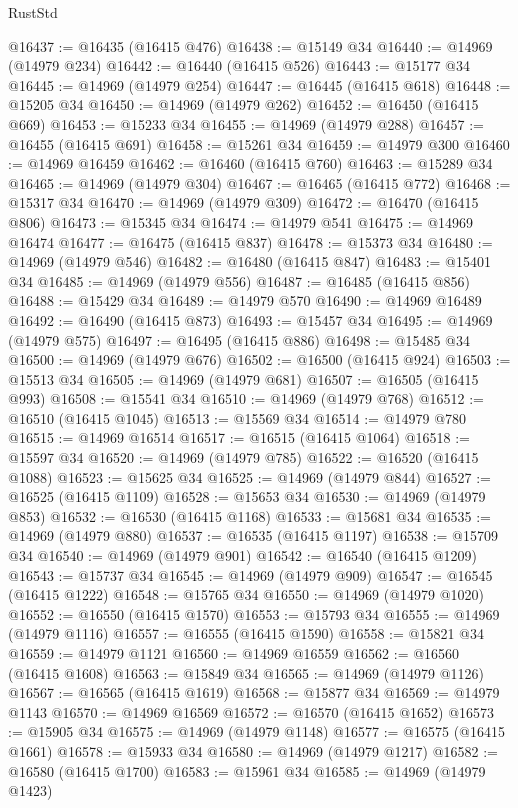 \begin{lexlean}{RustStd}
\begin{coremodule}
@16437 := @16435 (@16415 @476)
@16438 := @15149 @34
@16440 := @14969 (@14979 @234)
@16442 := @16440 (@16415 @526)
@16443 := @15177 @34
@16445 := @14969 (@14979 @254)
@16447 := @16445 (@16415 @618)
@16448 := @15205 @34
@16450 := @14969 (@14979 @262)
@16452 := @16450 (@16415 @669)
@16453 := @15233 @34
@16455 := @14969 (@14979 @288)
@16457 := @16455 (@16415 @691)
@16458 := @15261 @34
@16459 := @14979 @300
@16460 := @14969 @16459
@16462 := @16460 (@16415 @760)
@16463 := @15289 @34
@16465 := @14969 (@14979 @304)
@16467 := @16465 (@16415 @772)
@16468 := @15317 @34
@16470 := @14969 (@14979 @309)
@16472 := @16470 (@16415 @806)
@16473 := @15345 @34
@16474 := @14979 @541
@16475 := @14969 @16474
@16477 := @16475 (@16415 @837)
@16478 := @15373 @34
@16480 := @14969 (@14979 @546)
@16482 := @16480 (@16415 @847)
@16483 := @15401 @34
@16485 := @14969 (@14979 @556)
@16487 := @16485 (@16415 @856)
@16488 := @15429 @34
@16489 := @14979 @570
@16490 := @14969 @16489
@16492 := @16490 (@16415 @873)
@16493 := @15457 @34
@16495 := @14969 (@14979 @575)
@16497 := @16495 (@16415 @886)
@16498 := @15485 @34
@16500 := @14969 (@14979 @676)
@16502 := @16500 (@16415 @924)
@16503 := @15513 @34
@16505 := @14969 (@14979 @681)
@16507 := @16505 (@16415 @993)
@16508 := @15541 @34
@16510 := @14969 (@14979 @768)
@16512 := @16510 (@16415 @1045)
@16513 := @15569 @34
@16514 := @14979 @780
@16515 := @14969 @16514
@16517 := @16515 (@16415 @1064)
@16518 := @15597 @34
@16520 := @14969 (@14979 @785)
@16522 := @16520 (@16415 @1088)
@16523 := @15625 @34
@16525 := @14969 (@14979 @844)
@16527 := @16525 (@16415 @1109)
@16528 := @15653 @34
@16530 := @14969 (@14979 @853)
@16532 := @16530 (@16415 @1168)
@16533 := @15681 @34
@16535 := @14969 (@14979 @880)
@16537 := @16535 (@16415 @1197)
@16538 := @15709 @34
@16540 := @14969 (@14979 @901)
@16542 := @16540 (@16415 @1209)
@16543 := @15737 @34
@16545 := @14969 (@14979 @909)
@16547 := @16545 (@16415 @1222)
@16548 := @15765 @34
@16550 := @14969 (@14979 @1020)
@16552 := @16550 (@16415 @1570)
@16553 := @15793 @34
@16555 := @14969 (@14979 @1116)
@16557 := @16555 (@16415 @1590)
@16558 := @15821 @34
@16559 := @14979 @1121
@16560 := @14969 @16559
@16562 := @16560 (@16415 @1608)
@16563 := @15849 @34
@16565 := @14969 (@14979 @1126)
@16567 := @16565 (@16415 @1619)
@16568 := @15877 @34
@16569 := @14979 @1143
@16570 := @14969 @16569
@16572 := @16570 (@16415 @1652)
@16573 := @15905 @34
@16575 := @14969 (@14979 @1148)
@16577 := @16575 (@16415 @1661)
@16578 := @15933 @34
@16580 := @14969 (@14979 @1217)
@16582 := @16580 (@16415 @1700)
@16583 := @15961 @34
@16585 := @14969 (@14979 @1423)

\end{coremodule}
\end{lexlean}
